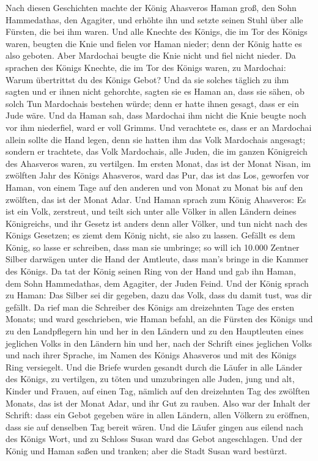  Nach diesen Geschichten machte der König Ahasveros Haman
groß, den Sohn Hammedathas, den Agagiter, und erhöhte ihn und setzte
seinen Stuhl über alle Fürsten, die bei ihm waren.  Und
alle Knechte des Königs, die im Tor des Königs waren, beugten die Knie
und fielen vor Haman nieder; denn der König hatte es also geboten. Aber
Mardochai beugte die Knie nicht und fiel nicht nieder.  Da
sprachen des Königs Knechte, die im Tor des Königs waren, zu Mardochai:
Warum übertrittst du des Königs Gebot?  Und da sie solches
täglich zu ihm sagten und er ihnen nicht gehorchte, sagten sie es Haman
an, dass sie sähen, ob solch Tun Mardochais bestehen würde; denn er
hatte ihnen gesagt, dass er ein Jude wäre.  Und da Haman
sah, dass Mardochai ihm nicht die Knie beugte noch vor ihm niederfiel,
ward er voll Grimms.  Und verachtete es, dass er an
Mardochai allein sollte die Hand legen, denn sie hatten ihm das Volk
Mardochais angesagt; sondern er trachtete, das Volk Mardochais, alle
Juden, die im ganzen Königreich des Ahasveros waren, zu vertilgen.
 Im ersten Monat, das ist der Monat Nisan, im zwölften
Jahr des Königs Ahasveros, ward das Pur, das ist das Los, geworfen vor
Haman, von einem Tage auf den anderen und von Monat zu Monat bis auf den
zwölften, das ist der Monat Adar.  Und Haman sprach zum
König Ahasveros: Es ist ein Volk, zerstreut, und teilt sich unter alle
Völker in allen Ländern deines Königreichs, und ihr Gesetz ist anders
denn aller Völker, und tun nicht nach des Königs Gesetzen; es ziemt dem
König nicht, sie also zu lassen.  Gefällt es dem König, so
lasse er schreiben, dass man sie umbringe; so will ich 10.000 Zentner
Silber darwägen unter die Hand der Amtleute, dass man's bringe in die
Kammer des Königs.  Da tat der König seinen Ring von der
Hand und gab ihn Haman, dem Sohn Hammedathas, dem Agagiter, der Juden
Feind.  Und der König sprach zu Haman: Das Silber sei dir
gegeben, dazu das Volk, dass du damit tust, was dir gefällt.
 Da rief man die Schreiber des Königs am dreizehnten Tage
des ersten Monats; und ward geschrieben, wie Haman befahl, an die
Fürsten des Königs und zu den Landpflegern hin und her in den Ländern
und zu den Hauptleuten eines jeglichen Volks in den Ländern hin und her,
nach der Schrift eines jeglichen Volks und nach ihrer Sprache, im Namen
des Königs Ahasveros und mit des Königs Ring versiegelt. 
Und die Briefe wurden gesandt durch die Läufer in alle Länder des
Königs, zu vertilgen, zu töten und umzubringen alle Juden, jung und alt,
Kinder und Frauen, auf einen Tag, nämlich auf den dreizehnten Tag des
zwölften Monats, das ist der Monat Adar, und ihr Gut zu rauben.
 Also war der Inhalt der Schrift: dass ein Gebot gegeben
wäre in allen Ländern, allen Völkern zu eröffnen, dass sie auf denselben
Tag bereit wären.  Und die Läufer gingen aus eilend nach
des Königs Wort, und zu Schloss Susan ward das Gebot angeschlagen. Und
der König und Haman saßen und tranken; aber die Stadt Susan ward
bestürzt.

